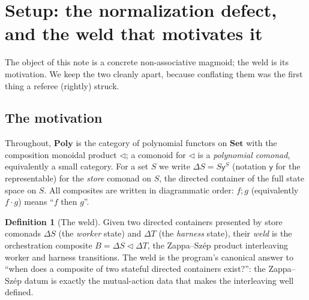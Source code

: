 \documentclass[11pt]{amsart}
\theoremstyle{plain}
\theoremstyle{definition}
\newtheorem{definition}[theorem]{Definition}
\theoremstyle{remark}
\newcommand{\Poly}{\mathbf{Poly}}
\newcommand{\Set}{\mathbf{Set}}
\renewcommand{\lhd}{\triangleleft}
\newcommand{\Store}[1]{\Delta #1}
\newcommand{\comp}{\mathbin{;}}
\newcommand{\yon}{\mathsf{y}}
\begin{document}

\section{Setup: the normalization defect, and the weld that motivates it}
\label{sec:setup}

The object of this note is a concrete non-associative magmoid; the weld is its motivation. We keep
the two cleanly apart, because conflating them was the first thing a referee (rightly) struck.

\subsection*{The motivation}
Throughout, $\Poly$ is the category of polynomial functors on $\Set$ with the composition monoidal
product $\lhd$; a comonoid for $\lhd$ is a \emph{polynomial comonad}, equivalently a small category.
For a set $S$ we write $\Store{S}=S\yon{}^{S}$ (notation $\yon{}$ for the representable) for the
\emph{store} comonad on $S$, the directed container of the full state space on $S$. All composites
are written in diagrammatic order: $f\comp g$ (equivalently $f\cdot g$) means ``$f$ then $g$''.

\begin{definition}[The weld]
\label{def:weld}
Given two directed containers presented by store comonads $\Store{S}$ (the \emph{worker} state) and
$\Store{T}$ (the \emph{harness} state), their \emph{weld} is the orchestration composite
$B=\Store{S}\lhd\Store{T}$, the Zappa--Sz\'ep product interleaving worker and harness transitions.
The weld is the program's canonical answer to ``when does a composite of two stateful directed
containers exist?'': the Zappa--Sz\'ep datum is exactly the mutual-action data that makes the
interleaving well defined.
\end{definition}
\end{document}
